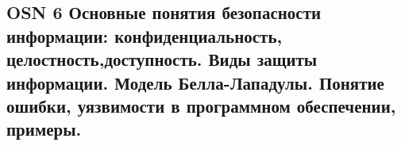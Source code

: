 \subsection{OSN 6 Основные понятия безопасности информации: конфиденциальность, целостность,доступность. Виды защиты информации. Модель Белла-Лападулы. Понятие ошибки, уязвимости в программном обеспечении, примеры.}
